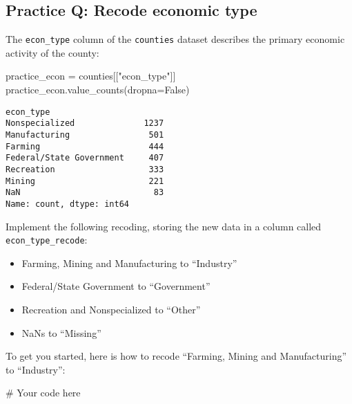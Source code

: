 \documentclass[
  letterpaper,
  DIV=11,
  numbers=noendperiod]{scrreprt}
\newenvironment{Shaded}{\begin{snugshade}}{\end{snugshade}}
\newcommand{\CommentTok}[1]{\textcolor[rgb]{0.37,0.37,0.37}{#1}}
\newcommand{\NormalTok}[1]{\textcolor[rgb]{0.00,0.23,0.31}{#1}}
\newcommand{\OperatorTok}[1]{\textcolor[rgb]{0.37,0.37,0.37}{#1}}
\newcommand{\StringTok}[1]{\textcolor[rgb]{0.13,0.47,0.30}{#1}}
\newcommand{\VariableTok}[1]{\textcolor[rgb]{0.07,0.07,0.07}{#1}}
\providecommand{\tightlist}{%
  \setlength{\itemsep}{0pt}\setlength{\parskip}{0pt}}\usepackage{longtable,booktabs,array}
\begin{document}
\begin{tcolorbox}[enhanced jigsaw, colframe=quarto-callout-tip-color-frame, opacityback=0, titlerule=0mm, bottomrule=.15mm, breakable, leftrule=.75mm, colbacktitle=quarto-callout-tip-color!10!white, title=\textcolor{quarto-callout-tip-color}{\faLightbulb}\hspace{0.5em}{Practice}, rightrule=.15mm, coltitle=black, opacitybacktitle=0.6, colback=white, left=2mm, arc=.35mm, toptitle=1mm, bottomtitle=1mm, toprule=.15mm]

\subsection{Practice Q: Recode economic
type}\label{practice-q-recode-economic-type}

The \texttt{econ\_type} column of the \texttt{counties} dataset
describes the primary economic activity of the county:

\begin{Shaded}
\begin{Highlighting}[]
\NormalTok{practice\_econ }\OperatorTok{=}\NormalTok{ counties[[}\StringTok{"econ\_type"}\NormalTok{]]}
\NormalTok{practice\_econ.value\_counts(dropna}\OperatorTok{=}\VariableTok{False}\NormalTok{)}
\end{Highlighting}
\end{Shaded}

\begin{verbatim}
econ_type               
Nonspecialized              1237
Manufacturing                501
Farming                      444
Federal/State Government     407
Recreation                   333
Mining                       221
NaN                           83
Name: count, dtype: int64
\end{verbatim}

Implement the following recoding, storing the new data in a column
called \texttt{econ\_type\_recode}:

\begin{itemize}
\tightlist
\item
  Farming, Mining and Manufacturing to ``Industry''
\item
  Federal/State Government to ``Government''
\item
  Recreation and Nonspecialized to ``Other''
\item
  NaNs to ``Missing''
\end{itemize}

To get you started, here is how to recode ``Farming, Mining and
Manufacturing'' to ``Industry'':

\begin{Shaded}
\begin{Highlighting}[]
\CommentTok{\# Your code here}
\end{Highlighting}
\end{Shaded}

\end{tcolorbox}
\end{document}
